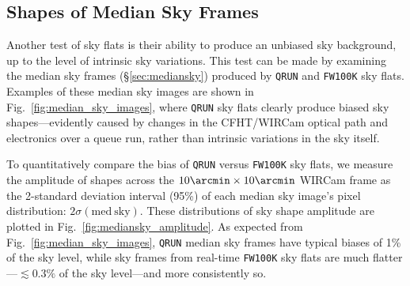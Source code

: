 \documentclass[iop]{emulateapj}
\newcommand{\Fig}[1]{Fig.~\ref{fig:#1}}  %
\newcommand{\Sec}[1]{\S\ref{sec:#1}}  %
\begin{document}
\subsection{Shapes of Median Sky Frames}
\label{sec:medianskyshapes}

Another test of sky flats is their ability to produce an unbiased sky background, up to the level of intrinsic sky variations.
This test can be made by examining the median sky frames (\Sec{mediansky}) produced by \texttt{QRUN} and \texttt{FW100K} sky flats.
Examples of these median sky images are shown in \Fig{median_sky_images}, where \texttt{QRUN} sky flats clearly produce biased sky shapes---evidently caused by changes in the CFHT/WIRCam optical path and electronics over a queue run, rather than intrinsic variations in the sky itself.

To quantitatively compare the bias of \texttt{QRUN} versus \texttt{FW100K} sky flats, we measure the amplitude of shapes across the $10\arcmin \times 10\arcmin$ WIRCam frame as the 2-standard deviation interval (95\%) of each median sky image's pixel distribution: $2 \sigma(\mathrm{med~sky})$.
These distributions of sky shape amplitude are plotted in \Fig{mediansky_amplitude}.
As expected from \Fig{median_sky_images}, \texttt{QRUN} median sky frames have typical biases of 1\% of the sky level, while sky frames from real-time \texttt{FW100K} sky flats are much flatter---$\lesssim 0.3\%$ of the sky level---and more consistently so.
\end{document}

